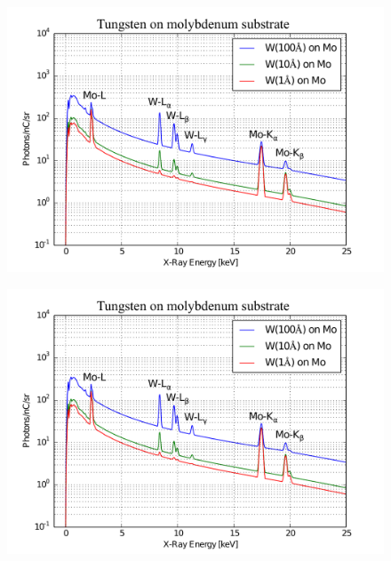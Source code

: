 \documentclass[12pt,letterpaper,final]{article}
\begin{document}
\begin{figure}[!h]
 \centering
  \includegraphics[width=\columnwidth]{figures//cModApplications/Tungsten_WMoSpectra.pdf}
 \caption{}
 \label{fig:Tungsten_WMoSpectra}
\end{figure}


\begin{figure}[!h]
 \centering
  \includegraphics[width=\columnwidth]{figures//cModApplications/Tungsten_WMoSpectra.pdf}
 \caption{}
 \label{fig:Tungsten_WMoSpectra}
\end{figure}
\end{document}
